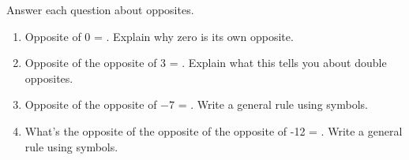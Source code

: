 \documentclass[12pt, letterpaper, fleqn]{article}
\newcommand{\blank}{\underline{\hspace{2.2cm}}}
\begin{document}
\noindent
Answer each question about opposites.

\vspace{3mm}
\begin{enumerate}[itemsep=2.4cm, leftmargin=0.6cm]
\item Opposite of 0 = \blank. Explain why zero is its own opposite.

\vspace{1.5cm}

\item Opposite of the opposite of 3 = \blank. Explain what this tells you about double opposites.

\vspace{1.5cm}

\item Opposite of the opposite of $-7$ = \blank. Write a general rule using symbols.

\vspace{1.5cm}

\item What's the opposite of the opposite of the opposite of -12 = \blank. Write a general rule using symbols.

\vspace{1.5cm}

\end{enumerate}
\end{document}

